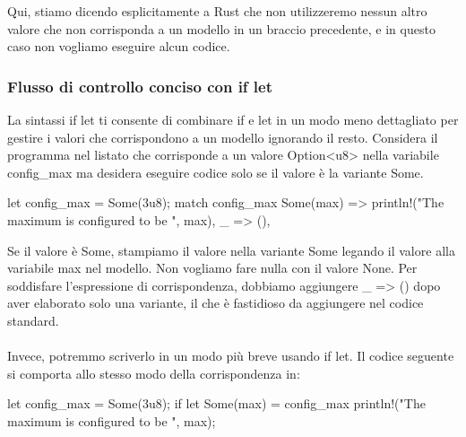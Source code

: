 \documentclass[11pt,a4paper]{article}
\begin{document}
Qui, stiamo dicendo esplicitamente a Rust che non utilizzeremo nessun altro valore che non corrisponda a un modello in un braccio precedente, e in questo caso non vogliamo eseguire alcun codice.

\subsubsection{Flusso di controllo conciso con if let}
La sintassi if let ti consente di combinare if e let in un modo meno dettagliato per gestire i valori che corrispondono a un modello ignorando il resto. Considera il programma nel listato che corrisponde a un valore Option<u8> nella variabile config\_max ma desidera eseguire codice solo se il valore è la variante Some.
\begin{rust}
    let config_max = Some(3u8);
    match config_max {
        Some(max) => println!("The maximum is configured to be {}", max),
        _ => (),
    }
\end{rust}
Se il valore è Some, stampiamo il valore nella variante Some legando il valore alla variabile max nel modello. Non vogliamo fare nulla con il valore None. Per soddisfare l'espressione di corrispondenza, dobbiamo aggiungere \_ => () dopo aver elaborato solo una variante, il che è fastidioso da aggiungere nel codice standard.\\
\\
Invece, potremmo scriverlo in un modo più breve usando if let. Il codice seguente si comporta allo stesso modo della corrispondenza in:

\begin{rust}
    let config_max = Some(3u8);
    if let Some(max) = config_max {
        println!("The maximum is configured to be {}", max);
    }
\end{rust}
\end{document}
